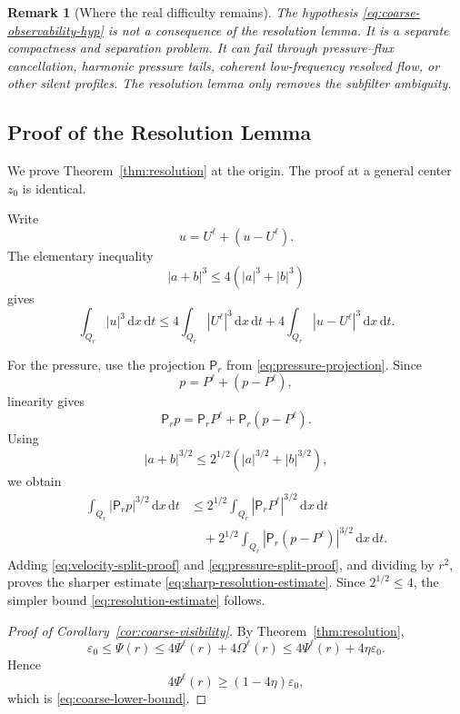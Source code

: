 \documentclass[10pt,a4paper]{amsart}
\numberwithin{equation}{section}
\newtheorem{remark}[theorem]{Remark}
\newcommand{\eps}{\varepsilon}
\newcommand{\dxdt}{\,\mathrm dx\,\mathrm dt}
\newcommand{\Pf}{\mathsf P}
\begin{document}
\begin{remark}[Where the real difficulty remains]
The hypothesis \eqref{eq:coarse-observability-hyp} is not a consequence of the resolution lemma.  It is a separate compactness and separation problem.  It can fail through pressure--flux cancellation, harmonic pressure tails, coherent low-frequency resolved flow, or other silent profiles.  The resolution lemma only removes the subfilter ambiguity.
\end{remark}
\subsection{Proof of the Resolution Lemma}

We prove Theorem~\ref{thm:resolution} at the origin.  The proof at a general center $z_0$ is identical.

Write
\[
u=U^\ell+(u-U^\ell).
\]
The elementary inequality
\begin{equation}\label{eq:p-power-ineq-3}
|a+b|^3\le 4(|a|^3+|b|^3)
\end{equation}
gives
\begin{equation}\label{eq:velocity-split-proof}
\int_{Q_r}|u|^3\dxdt
\le
4\int_{Q_r}|U^\ell|^3\dxdt
+
4\int_{Q_r}|u-U^\ell|^3\dxdt.
\end{equation}

For the pressure, use the projection $\Pf_r$ from \eqref{eq:pressure-projection}.  Since
\[
p=P^\ell+(p-P^\ell),
\]
linearity gives
\begin{equation}\label{eq:pressure-exact-split}
\Pf_r p=\Pf_r P^\ell+\Pf_r(p-P^\ell).
\end{equation}
Using
\begin{equation}\label{eq:p-power-ineq-32}
|a+b|^{3/2}\le 2^{1/2}\left(|a|^{3/2}+|b|^{3/2}\right),
\end{equation}
we obtain
\begin{align}\label{eq:pressure-split-proof}
\int_{Q_r}|\Pf_r p|^{3/2}\dxdt
&\le
2^{1/2}\int_{Q_r}|\Pf_r P^\ell|^{3/2}\dxdt
\nonumber\\
&\quad+
2^{1/2}\int_{Q_r}|\Pf_r(p-P^\ell)|^{3/2}\dxdt.
\end{align}
Adding \eqref{eq:velocity-split-proof} and \eqref{eq:pressure-split-proof}, and dividing by $r^2$, proves the sharper estimate \eqref{eq:sharp-resolution-estimate}.  Since $2^{1/2}\le4$, the simpler bound \eqref{eq:resolution-estimate} follows.

\begin{proof}[Proof of Corollary~\ref{cor:coarse-visibility}]
By Theorem~\ref{thm:resolution},
\[
\eps_0\le\Psi(r)\le4\Psi^\ell(r)+4\Omega^\ell(r)
\le4\Psi^\ell(r)+4\eta\eps_0.
\]
Hence
\[
4\Psi^\ell(r)\ge(1-4\eta)\eps_0,
\]
which is \eqref{eq:coarse-lower-bound}.
\end{proof}
\end{document}
